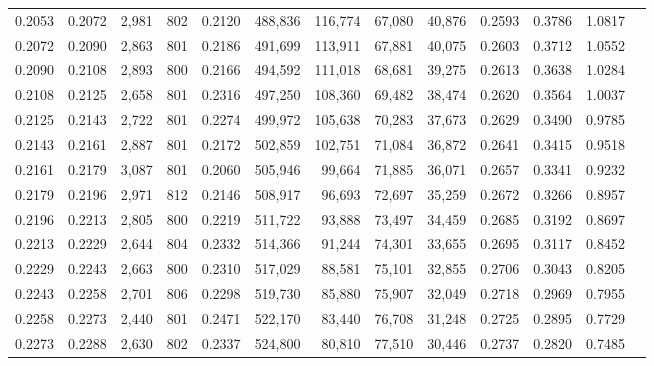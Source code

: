 \begin{tabular}{rrrrrrrrrrrrr}
0.2053 & 0.2072 &  2,981 & 802 &                                     0.2120 & 488,836 & 116,774 &  67,080 &  40,876 & 0.2593 & 0.3786 & 1.0817 \\
0.2072 & 0.2090 &  2,863 & 801 &                                     0.2186 & 491,699 & 113,911 &  67,881 &  40,075 & 0.2603 & 0.3712 & 1.0552 \\
0.2090 & 0.2108 &  2,893 & 800 &                                     0.2166 & 494,592 & 111,018 &  68,681 &  39,275 & 0.2613 & 0.3638 & 1.0284 \\
0.2108 & 0.2125 &  2,658 & 801 &                                     0.2316 & 497,250 & 108,360 &  69,482 &  38,474 & 0.2620 & 0.3564 & 1.0037 \\
0.2125 & 0.2143 &  2,722 & 801 &                                     0.2274 & 499,972 & 105,638 &  70,283 &  37,673 & 0.2629 & 0.3490 & 0.9785 \\
0.2143 & 0.2161 &  2,887 & 801 &                                     0.2172 & 502,859 & 102,751 &  71,084 &  36,872 & 0.2641 & 0.3415 & 0.9518 \\
0.2161 & 0.2179 &  3,087 & 801 &                                     0.2060 & 505,946 &  99,664 &  71,885 &  36,071 & 0.2657 & 0.3341 & 0.9232 \\
0.2179 & 0.2196 &  2,971 & 812 &                                     0.2146 & 508,917 &  96,693 &  72,697 &  35,259 & 0.2672 & 0.3266 & 0.8957 \\
0.2196 & 0.2213 &  2,805 & 800 &                                     0.2219 & 511,722 &  93,888 &  73,497 &  34,459 & 0.2685 & 0.3192 & 0.8697 \\
0.2213 & 0.2229 &  2,644 & 804 &                                     0.2332 & 514,366 &  91,244 &  74,301 &  33,655 & 0.2695 & 0.3117 & 0.8452 \\
0.2229 & 0.2243 &  2,663 & 800 &                                     0.2310 & 517,029 &  88,581 &  75,101 &  32,855 & 0.2706 & 0.3043 & 0.8205 \\
0.2243 & 0.2258 &  2,701 & 806 &                                     0.2298 & 519,730 &  85,880 &  75,907 &  32,049 & 0.2718 & 0.2969 & 0.7955 \\
0.2258 & 0.2273 &  2,440 & 801 &                                     0.2471 & 522,170 &  83,440 &  76,708 &  31,248 & 0.2725 & 0.2895 & 0.7729 \\
0.2273 & 0.2288 &  2,630 & 802 &                                     0.2337 & 524,800 &  80,810 &  77,510 &  30,446 & 0.2737 & 0.2820 & 0.7485 \\

\end{tabular}
